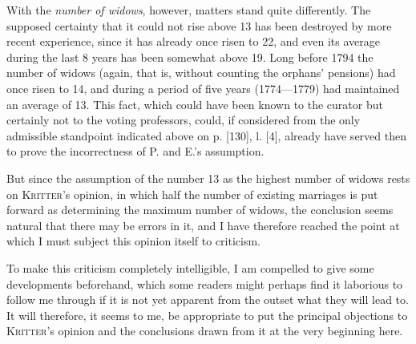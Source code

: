 With the \textit{number of widows}, however, matters stand quite differently. The supposed certainty that it could not rise above 13 has been destroyed by more recent experience, since it has already once risen to 22, and even its average during the last 8 years has been somewhat above 19. Long before 1794 the number of widows (again, that is, without counting the orphans' pensions) had once risen to 14, and during a period of five years (1774—1779) had maintained an average of 13. This fact, which could have been known to the curator but certainly not to the voting professors, could, if considered from the only admissible standpoint indicated above on p. [130], l. [4], already have served then to prove the incorrectness of P. and E.'s assumption.

But since the assumption of the number 13 as the highest number of widows rests on \textsc{Kritter}'s opinion, in which half the number of existing marriages is put forward as determining the maximum number of widows, the conclusion seems natural that there may be errors in it, and I have therefore reached the point at which I must subject this opinion itself to criticism.
\par{}\noindent
To make this criticism completely intelligible, I am compelled to give some developments beforehand, which some readers might perhaps find it laborious to follow me through if it is not yet apparent from the outset what they will lead to. It will therefore, it seems to me, be appropriate to put the principal objections to \textsc{Kritter}'s opinion and the conclusions drawn from it at the very beginning here.
